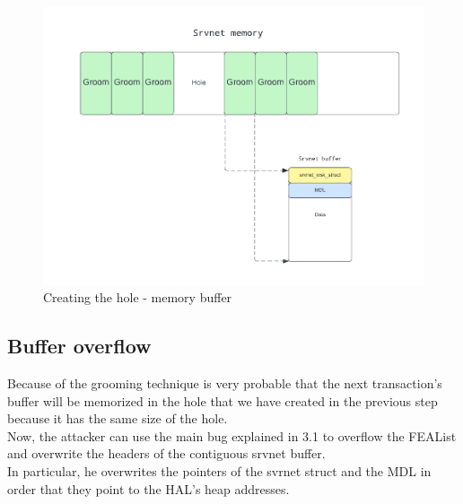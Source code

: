 \begin{figure}[ht!]
    \centering
      \includegraphics[scale=0.5]{images/exploit_4_buff.png}
      \caption{Creating the hole - memory buffer}
\end{figure}

\clearpage
\subsection{Buffer overflow}
Because of the grooming technique is very probable that the next transaction's buffer will be memorized in 
the hole that we have created in the previous step because it has the same size of the hole.\\
Now, the attacker can use the main bug explained in 3.1 to overflow the FEAList and overwrite the headers of the contiguous srvnet buffer.\\
In particular, he overwrites the pointers of the svrnet struct and the MDL in order that they point to the HAL's heap addresses.

